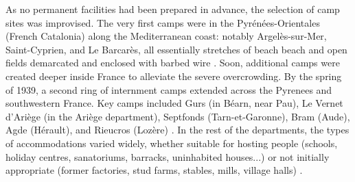 As no permanent facilities had been prepared in advance, the selection of camp sites was improvised. The very first camps were in the Pyrénées-Orientales (French Catalonia) along the Mediterranean coast: notably Argelès-sur-Mer, Saint-Cyprien, and Le Barcarès, all essentially stretches of beach beach and open fields demarcated and enclosed with barbed wire \citep{Coignard2012}. Soon, additional camps were created deeper inside France to alleviate the severe overcrowding. By the spring of 1939, a second ring of internment camps extended across the Pyrenees and southwestern France. Key camps included Gurs (in Béarn, near Pau), Le Vernet d’Ariège (in the Ariège department), Septfonds (Tarn-et-Garonne), Bram (Aude), Agde (Hérault), and Rieucros (Lozère) \citep{Coignard2012}. In the rest of the departments, the types of accommodations varied widely, whether suitable for hosting people (schools, holiday centres, sanatoriums, barracks, uninhabited houses...) or not initially appropriate (former factories, stud farms, stables, mills, village halls) \citep{DreyfusArmand1999}.


